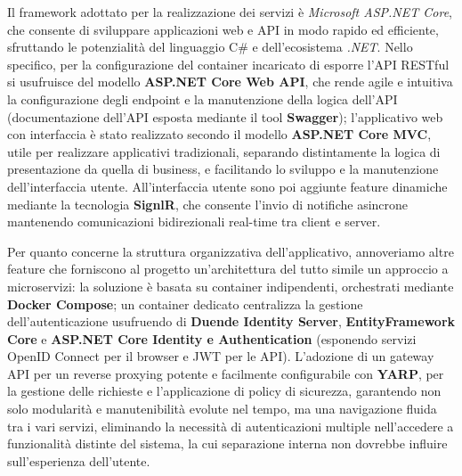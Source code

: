 Il framework adottato per la realizzazione dei servizi è \emph{Microsoft ASP.NET Core}, che consente di sviluppare applicazioni web e API in modo rapido ed efficiente, sfruttando le potenzialità del linguaggio C\# e dell'ecosistema \emph{.NET}.
Nello specifico, per la configurazione del container incaricato di esporre l'API RESTful si usufruisce del modello \textbf{ASP.NET Core Web API}, che rende agile e intuitiva la configurazione degli endpoint e la manutenzione della logica dell'API (documentazione dell'API esposta mediante il tool \textbf{Swagger}); l'applicativo web con interfaccia è stato realizzato secondo il modello \textbf{ASP.NET Core MVC}, utile per realizzare applicativi tradizionali\footnotemark, separando distintamente la logica di presentazione da quella di business, e facilitando lo sviluppo e la manutenzione dell'interfaccia utente. All'interfaccia utente sono poi aggiunte feature dinamiche mediante la tecnologia \textbf{SignlR}, che consente l'invio di notifiche asincrone mantenendo comunicazioni bidirezionali real-time tra client e server.

Per quanto concerne la struttura organizzativa dell'applicativo, annoveriamo altre feature che forniscono al progetto un'architettura del tutto simile un approccio a microservizi: la soluzione è basata su container indipendenti, orchestrati mediante \textbf{Docker Compose}; un container dedicato centralizza la gestione dell'autenticazione usufruendo di \textbf{Duende Identity Server}, \textbf{EntityFramework Core} e \textbf{ASP.NET Core Identity e Authentication} (esponendo servizi OpenID Connect per il browser e JWT per le API). L'adozione di un gateway API per un reverse proxying potente e facilmente configurabile con \textbf{YARP}, per la gestione delle richieste e l'applicazione di policy di sicurezza, garantendo non solo modularità e manutenibilità evolute nel tempo, ma una navigazione fluida tra i vari servizi, eliminando la necessità di autenticazioni multiple nell'accedere a funzionalità distinte del sistema, la cui separazione interna non dovrebbe influire sull'esperienza dell'utente.

